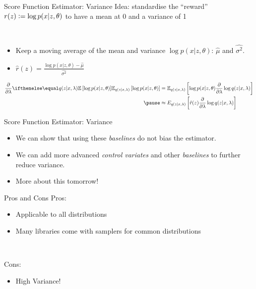 \begin{frame}{Score Function Estimator: Variance}
Idea: standardise the ``reward'' $r(z) \vcentcolon= \log p(x|z, \theta)$ to have a mean at 0 and a variance of 1 \pause

~ 

\begin{itemize}
  \setlength\itemsep{0.7em}
    \item Keep a moving average of the mean and variance $\log p(x|z, \theta)$: $\hat{\mu}$ and $\hat{\sigma^2}$. \pause
    \item $\hat{r}(z) = \frac{\log p(x|z, \theta)-\hat{\mu}}{\hat{\sigma^2}}$
\end{itemize}

\pause

\begin{small}
\begin{equation*}
\begin{aligned}
\pdv{\lambda}\E[q(z|x,\lambda)]{\log p(x|z,\theta)}
&= \mathbb E_{q(z|x,\lambda)} \left[  \log p(x|z,\theta)  \pdv{\lambda}\log q(z|x,\lambda)\right]\\ \pause
&\approx E_{q(z|x,\lambda)} \left[  \hat{r}(z) \pdv{\lambda}\log q(z|x,\lambda)\right]
\end{aligned}
\end{equation*}
\end{small}

\end{frame}

\begin{frame}{Score Function Estimator: Variance}

\begin{itemize}
    \item We can show that using these \emph{baselines} do not bias the estimator. \pause
    \item We can add more advanced \emph{control variates} and other \emph{baselines} to further reduce variance. \pause
    \item More about this tomorrow!
\end{itemize}

\end{frame}

\begin{frame}{Pros and Cons}
Pros:
\begin{itemize}
\item Applicable to all distributions
\item Many libraries come with samplers for common distributions
\end{itemize}
\pause

~

Cons:
\begin{itemize}
\item High Variance!
\end{itemize}
\end{frame}



